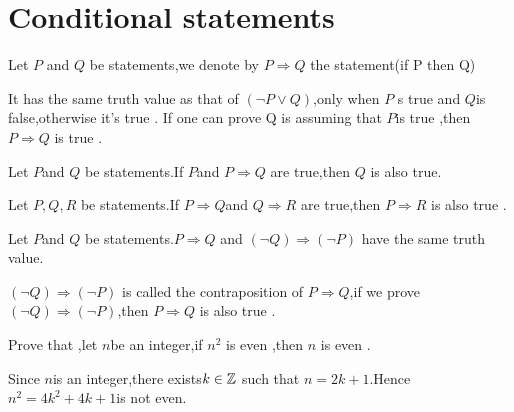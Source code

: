 \documentclass{book}
\numberwithin{equation}{section}
\begin{document}
\section{Conditional statements}
\begin{definitionenv}
    Let $P$ and $Q$ be statements,we denote by $P\Rightarrow Q$ the statement(if P then Q)
\end{definitionenv}
\begin{remark}
    It has the same truth value as that of $(\neg P\vee Q)$,only when $P$ s true and $Q$is false,otherwise it's true .
    \newline
    If one can prove Q is assuming that $P$is true ,then $P\Rightarrow Q$ is true .
\end{remark}
\begin{propositionenv}
    Let $P$and $Q$ be statements.If $P$and $P\Rightarrow Q$ are true,then $Q$ is also true.
\end{propositionenv}
\begin{propositionenv}
    Let $P,Q,R$ be statements.If $P \Rightarrow Q$and $Q\Rightarrow R$ are true,then $P\Rightarrow R$ is also true .
\end{propositionenv}
\begin{theoremenv}
    Let $P$and $Q$ be statements.$P\Rightarrow Q$ and $(\neg Q)\Rightarrow (\neg P)$ have the same truth value.
\end{theoremenv}
$(\neg Q)\Rightarrow (\neg P)$ is called the contraposition of $P\Rightarrow Q$,if we prove $(\neg Q)\Rightarrow (\neg P)$,then $P\Rightarrow Q$ is also true .
\begin{exampleenv}
    Prove that ,let $n$be an integer,if $n^2$ is even ,then $n$ is even .
    \begin{proofenv}
        Since $n$is an integer,there exists$k\in \mathbb{Z}$ such that $n=2k+1$.Hence $n^2=4k^2+4k+1$is not even.
    \end{proofenv}
\end{exampleenv}
\end{document}
